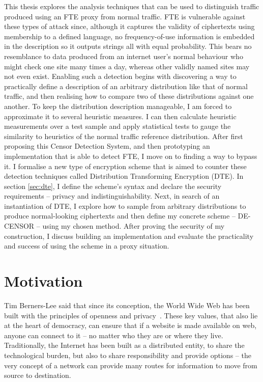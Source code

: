 \documentclass[ %
                    author={Samuel Russell},
                supervisor={Prof. Bogdan Warinschi},
                    degree={MEng},
                     title={Innocuous Ciphertexts},
                  subtitle={The DE-CENSOR Scheme},
                      type={research},
                      year={2018} ]{dissertation}
\begin{document}
This thesis explores the analysis techniques that can be used to distinguish traffic produced using an FTE proxy from normal traffic.
FTE is vulnerable against these types of attack since, although it captures the validity of ciphertexts using membership to a defined language, no frequency-of-use information is embedded in the description so it outputs strings all with equal probability.
This bears no resemblance to data produced from an internet user's normal behaviour who might check one site many times a day, whereas other validly named sites may not even exist. 
Enabling such a detection begins with discovering a way to practically define a description of an arbitrary distribution like that of normal traffic, and then realising how to compare two of these distributions against one another.
To keep the distribution description manageable, I am forced to approximate it to several heuristic measures. 
I can then calculate heuristic measurements over a test sample and apply statistical tests to gauge the similarity to heuristics of the normal traffic reference distribution.
After first proposing this Censor Detection System, and then prototyping an implementation that is able to detect FTE, I move on to finding a way to bypass it.
I formalise a new type of encryption scheme that is aimed to counter these detection techniques called Distribution Transforming Encryption (DTE).
In section \ref{sec:dte}, I define the scheme's syntax and declare the security requirements -- privacy and indistinguishability.
Next, in search of an instantiation of DTE, I explore how to sample from arbitrary distributions to produce normal-looking ciphertexts and then define my concrete scheme -- DE-CENSOR -- using my chosen method.
After proving the security of my construction, I discuss building an implementation and evaluate the practicality and success of using the scheme in a proxy situation.



\chapter{Motivation}
\label{chap:context}

Tim Berners-Lee said that since its conception, the World Wide Web has been built with the principles of openness and privacy~\cite{gard}.
These key values, that also lie at the heart of democracy, can ensure that if a website is made available on web, anyone can connect to it -- no matter who they are or where they live.
Traditionally, the Internet has been built as a distributed entity, to share the technological burden, but also to share responsibility and provide options -- the very concept of a network can provide many routes for information to move from source to destination.
\end{document}
